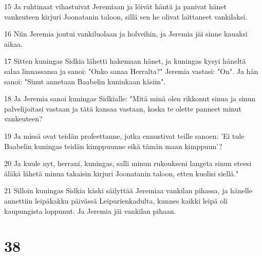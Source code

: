 \par 15 Ja ruhtinaat vihastuivat Jeremiaan ja löivät häntä ja panivat hänet vankeuteen kirjuri Joonatanin taloon, sillä sen he olivat laittaneet vankilaksi.
\par 16 Niin Jeremia joutui vankiluolaan ja holveihin, ja Jeremia jäi sinne kauaksi aikaa.
\par 17 Sitten kuningas Sidkia lähetti hakemaan hänet, ja kuningas kysyi häneltä salaa linnassansa ja sanoi: "Onko sanaa Herralta?" Jeremia vastasi: "On". Ja hän sanoi: "Sinut annetaan Baabelin kuninkaan käsiin".
\par 18 Ja Jeremia sanoi kuningas Sidkialle: "Mitä minä olen rikkonut sinua ja sinun palvelijoitasi vastaan ja tätä kansaa vastaan, koska te olette panneet minut vankeuteen?
\par 19 Ja missä ovat teidän profeettanne, jotka ennustivat teille sanoen: 'Ei tule Baabelin kuningas teidän kimppuunne eikä tämän maan kimppuun'?
\par 20 Ja kuule nyt, herrani, kuningas, salli minun rukoukseni langeta sinun eteesi äläkä lähetä minua takaisin kirjuri Joonatanin taloon, etten kuolisi siellä."
\par 21 Silloin kuningas Sidkia käski säilyttää Jeremiaa vankilan pihassa, ja hänelle annettiin leipäkakku päivässä Leipurienkadulta, kunnes kaikki leipä oli kaupungista loppunut. Ja Jeremia jäi vankilan pihaan.

\chapter{38}

